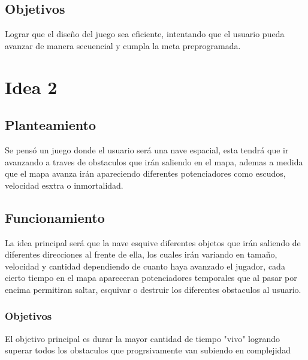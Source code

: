 \documentclass{article}
\begin{document}
\subsection{Objetivos}
 Lograr que el diseño del juego sea eficiente,  intentando que el usuario pueda avanzar de manera secuencial y cumpla la meta preprogramada. 

\section{Idea 2}
\subsection{Planteamiento}
Se pensó un juego donde el usuario será una nave espacial, esta tendrá que ir avanzando a traves de obstaculos que irán saliendo en el mapa, ademas a medida que el mapa avanza irán apareciendo diferentes potenciadores como escudos, velocidad esxtra o inmortalidad.

\subsection{Funcionamiento}
La idea principal será que la nave esquive diferentes objetos que irán saliendo de diferentes direcciones al frente de ella, los cuales irán variando en tamaño, velocidad y cantidad dependiendo de cuanto haya avanzado el jugador, cada cierto tiempo en el mapa apareceran potenciadores temporales que al pasar por encima permitiran saltar, esquivar o destruir los diferentes obstaculos al usuario.

\subsubsection{Objetivos}
El objetivo principal es durar la mayor cantidad de tiempo "vivo" logrando superar todos los obstaculos que progrsivamente van subiendo en complejidad
\end{document}
